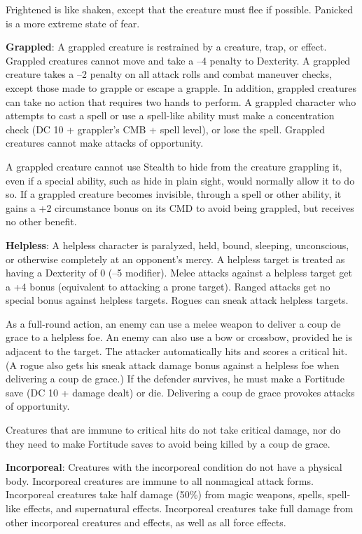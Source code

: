 Frightened is like shaken, except that the creature must flee if possible. Panicked is a more extreme state of fear.
				
\textbf{Grappled}: A grappled creature is restrained by a creature, trap, or effect. Grappled creatures cannot move and take a --4 penalty to Dexterity. A grappled creature takes a --2 penalty on all attack rolls and combat maneuver checks, except those made to grapple or escape a grapple. In addition, grappled creatures can take no action that requires two hands to perform. A grappled character who attempts to cast a spell or use a spell-like ability must make a concentration check (DC 10 + grappler's CMB + spell level), or lose the spell. Grappled creatures cannot make attacks of opportunity.
				
A grappled creature cannot use Stealth to hide from the creature grappling it, even if a special ability, such as hide in plain sight, would normally allow it to do so. If a grappled creature becomes invisible, through a spell or other ability, it gains a +2 circumstance bonus on its CMD to avoid being grappled, but receives no other benefit.
				
\textbf{Helpless}: A helpless character is paralyzed, held, bound, sleeping, unconscious, or otherwise completely at an opponent's mercy. A helpless target is treated as having a Dexterity of 0 (--5 modifier). Melee attacks against a helpless target get a +4 bonus (equivalent to attacking a prone target). Ranged attacks get no special bonus against helpless targets. Rogues can sneak attack helpless targets. 
				
As a full-round action, an enemy can use a melee weapon to deliver a coup de grace to a helpless foe. An enemy can also use a bow or crossbow, provided he is adjacent to the target. The attacker automatically hits and scores a critical hit. (A rogue also gets his sneak attack damage bonus against a helpless foe when delivering a coup de grace.) If the defender survives, he must make a Fortitude save (DC 10 + damage dealt) or die. Delivering a coup de grace provokes attacks of opportunity. 
				
Creatures that are immune to critical hits do not take critical damage, nor do they need to make Fortitude saves to avoid being killed by a coup de grace.
				
\textbf{Incorporeal}: Creatures with the incorporeal condition do not have a physical body. Incorporeal creatures are immune to all nonmagical attack forms. Incorporeal creatures take half damage (50\%) from magic weapons, spells, spell-like effects, and supernatural effects. Incorporeal creatures take full damage from other incorporeal creatures and effects, as well as all force effects. 
				
